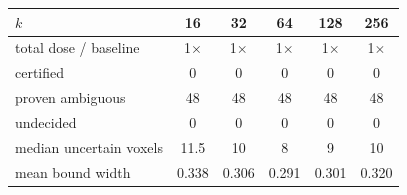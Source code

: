 \begin{tabular}{@{}lccccc@{}}\toprule
$k$ & 16 & 32 & 64 & 128 & 256\\\midrule
total dose / baseline & 1$\times$ & 1$\times$ & 1$\times$ & 1$\times$ & 1$\times$\\
certified & 0 & 0 & 0 & 0 & 0\\
proven ambiguous & 48 & 48 & 48 & 48 & 48\\
undecided & 0 & 0 & 0 & 0 & 0\\
median uncertain voxels & 11.5 & 10 & 8 & 9 & 10\\
mean bound width & 0.338 & 0.306 & 0.291 & 0.301 & 0.320\\
\bottomrule\end{tabular}
